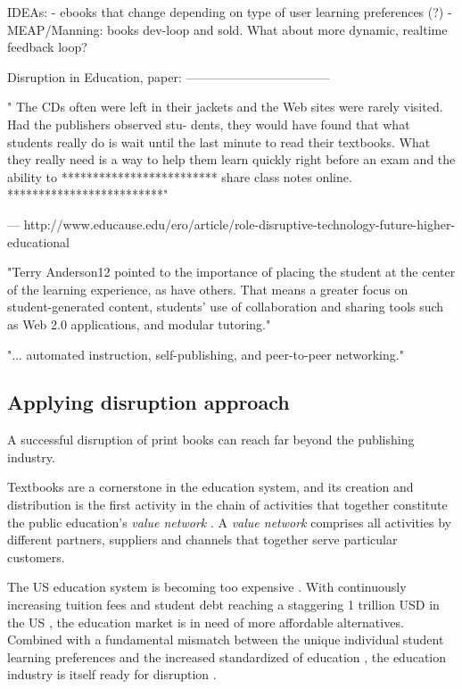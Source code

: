 \documentclass[a4paper,10pt]{book}
\begin{document}
 IDEAs: 
 - ebooks that change depending on type of user learning preferences (?)
 - MEAP/Manning: books dev-loop and sold. What about more dynamic, realtime feedback loop?
 
 
 Disruption in Education, paper:
-----------------------------------

" The CDs often were left in their jackets and the
Web sites were rarely visited. Had the publishers observed stu-
dents, they would have found that what students really do is
wait until the last minute to read their textbooks. What they
really need is a way to help them learn quickly right before an
exam and the ability to 
*************************
share class notes online.
*************************"


---
http://www.educause.edu/ero/article/role-disruptive-technology-future-higher-educational

"Terry Anderson12 pointed to the importance of placing the student at the center of the learning experience, as have others.
 That means a greater focus on student-generated content, students’ use of collaboration and sharing tools such as Web 2.0 applications, and modular tutoring."

"... automated instruction, self-publishing, and peer-to-peer networking."

\subsection{Applying disruption approach}
A successful disruption of print books can reach far beyond the publishing industry.

Textbooks are a cornerstone in the education system, and its creation and distribution is the first activity in 
the chain of activities that together constitute the public education's 
\emph{value network} \cite{DisruptingClassExpandedEdition}. A \emph{value network} comprises all activities by different partners, 
suppliers and channels that together serve particular customers.

The US education system is becoming too expensive \cite{theInnovativeUniversity}. 
With continuously increasing tuition fees \cite{risingTuitionFees}\cite{theInnovativeUniversity} and student debt 
reaching a staggering 1 trillion USD in the US \cite{oneTrillionUsStudentDebt}, the education market is in need of 
more affordable alternatives. Combined with a fundamental mismatch between the unique individual student learning 
preferences and the increased standardized of education \cite{DisruptingClassExpandedEdition}\cite{educationInnovationNecessaryForEconomicGrowth}, 
the education industry is itself ready for disruption \cite{DisruptingClassExpandedEdition}\cite{theInnovativeUniversity}.
\end{document}
